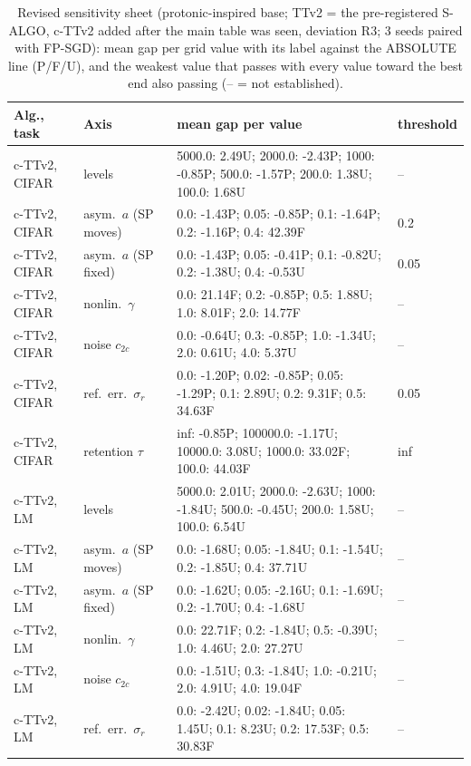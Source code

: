 \begin{table}[t]\centering\scriptsize\caption{Revised sensitivity sheet (protonic-inspired base; TTv2 = the pre-registered S-ALGO, c-TTv2 added after the main table was seen, deviation R3; 3 seeds paired with FP-SGD): mean gap per grid value with its label against the ABSOLUTE line (P/F/U), and the weakest value that passes with every value toward the best end also passing (-- = not established).}\label{tab:rev_spec}
\begin{tabular}{llp{8.8cm}l}\toprule Alg., task & Axis & mean gap per value & threshold\\\midrule
c-TTv2, CIFAR & levels & 5000.0: 2.49U; 2000.0: -2.43P; 1000: -0.85P; 500.0: -1.57P; 200.0: 1.38U; 100.0: 1.68U & --\\
c-TTv2, CIFAR & asym.\ $a$ (SP moves) & 0.0: -1.43P; 0.05: -0.85P; 0.1: -1.64P; 0.2: -1.16P; 0.4: 42.39F & 0.2\\
c-TTv2, CIFAR & asym.\ $a$ (SP fixed) & 0.0: -1.43P; 0.05: -0.41P; 0.1: -0.82U; 0.2: -1.38U; 0.4: -0.53U & 0.05\\
c-TTv2, CIFAR & nonlin.\ $\gamma$ & 0.0: 21.14F; 0.2: -0.85P; 0.5: 1.88U; 1.0: 8.01F; 2.0: 14.77F & --\\
c-TTv2, CIFAR & noise $c_{2c}$ & 0.0: -0.64U; 0.3: -0.85P; 1.0: -1.34U; 2.0: 0.61U; 4.0: 5.37U & --\\
c-TTv2, CIFAR & ref.\ err.\ $\sigma_r$ & 0.0: -1.20P; 0.02: -0.85P; 0.05: -1.29P; 0.1: 2.89U; 0.2: 9.31F; 0.5: 34.63F & 0.05\\
c-TTv2, CIFAR & retention $\tau$ & inf: -0.85P; 100000.0: -1.17U; 10000.0: 3.08U; 1000.0: 33.02F; 100.0: 44.03F & inf\\
c-TTv2, LM & levels & 5000.0: 2.01U; 2000.0: -2.63U; 1000: -1.84U; 500.0: -0.45U; 200.0: 1.58U; 100.0: 6.54U & --\\
c-TTv2, LM & asym.\ $a$ (SP moves) & 0.0: -1.68U; 0.05: -1.84U; 0.1: -1.54U; 0.2: -1.85U; 0.4: 37.71U & --\\
c-TTv2, LM & asym.\ $a$ (SP fixed) & 0.0: -1.62U; 0.05: -2.16U; 0.1: -1.69U; 0.2: -1.70U; 0.4: -1.68U & --\\
c-TTv2, LM & nonlin.\ $\gamma$ & 0.0: 22.71F; 0.2: -1.84U; 0.5: -0.39U; 1.0: 4.46U; 2.0: 27.27U & --\\
c-TTv2, LM & noise $c_{2c}$ & 0.0: -1.51U; 0.3: -1.84U; 1.0: -0.21U; 2.0: 4.91U; 4.0: 19.04F & --\\
c-TTv2, LM & ref.\ err.\ $\sigma_r$ & 0.0: -2.42U; 0.02: -1.84U; 0.05: 1.45U; 0.1: 8.23U; 0.2: 17.53F; 0.5: 30.83F & --\\

\end{tabular}
\end{table}
